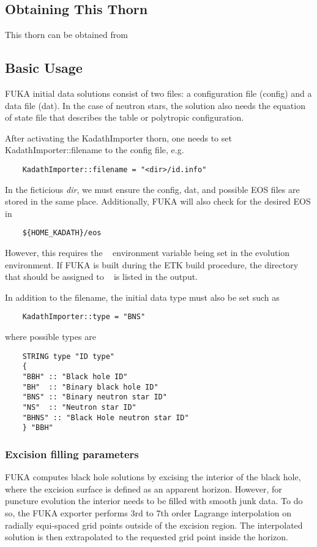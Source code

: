 \subsection{Obtaining This Thorn}
This thorn can be obtained from \cite{fukaws}

\subsection{Basic Usage}
FUKA initial data solutions consist of two files: a configuration file (config) and a data file (dat).  In the case of neutron stars,
the solution also needs the equation of state file that describes the table or polytropic configuration.

After activating the KadathImporter thorn, one needs to set KadathImporter::filename to the config file, e.g.
\begin{verbatim}
    KadathImporter::filename = "<dir>/id.info"
\end{verbatim}
In the ficticious \textit{dir}, we must ensure the config, dat, and possible EOS files are stored in the same place.  
Additionally, FUKA will also check for the desired EOS in
\begin{verbatim}
    ${HOME_KADATH}/eos
\end{verbatim}
However, this requires the \hk~ environment variable being set in the evolution environment.  If FUKA is built during
the ETK build procedure, the directory that should be assigned to \hk~ is listed in the output.

In addition to the filename, the initial data type must also be set such as
\begin{verbatim}
    KadathImporter::type = "BNS"
\end{verbatim}
where possible types are 
\begin{verbatim}
    STRING type "ID type"
    {
    "BBH" :: "Black hole ID"
    "BH"  :: "Binary black hole ID"
    "BNS" :: "Binary neutron star ID"
    "NS"  :: "Neutron star ID"
    "BHNS" :: "Black Hole neutron star ID"
    } "BBH"
\end{verbatim}

\subsubsection*{Excision filling parameters}
FUKA computes black hole solutions by excising the interior of the black hole, where
the excision surface is defined as an apparent horizon. However, for puncture evolution
the interior needs to be filled with smooth junk data.  To do so, the FUKA exporter
performs 3rd to 7th order Lagrange interpolation on radially equi-spaced grid points
outside of the excision region. The interpolated solution is then extrapolated
to the requested grid point inside the horizon.


